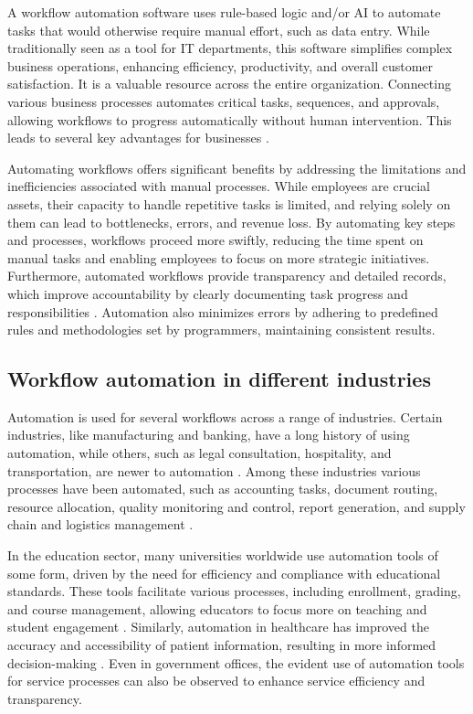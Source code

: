 A workflow automation software uses rule-based logic and/or AI to automate tasks that would otherwise require manual effort, such as data entry. While traditionally seen as a tool for IT departments, this software simplifies complex business operations, enhancing efficiency, productivity, and overall customer satisfaction. It is a valuable resource across the entire organization. Connecting various business processes automates critical tasks, sequences, and approvals, allowing workflows to progress automatically without human intervention. This leads to several key advantages for businesses \cite{servicenow}.

Automating workflows offers significant benefits by addressing the limitations and inefficiencies associated with manual processes. While employees are crucial assets, their capacity to handle repetitive tasks is limited, and relying solely on them can lead to bottlenecks, errors, and revenue loss. By automating key steps and processes, workflows proceed more swiftly, reducing the time spent on manual tasks and enabling employees to focus on more strategic initiatives. Furthermore, automated workflows provide transparency and detailed records, which improve accountability by clearly documenting task progress and responsibilities \cite{awati2024}. Automation also minimizes errors by adhering to predefined rules and methodologies set by programmers, maintaining consistent results.

\subsection{Workflow automation in different industries}

Automation is used for several workflows across a range of industries. Certain industries, like manufacturing and banking, have a long history of using automation, while others, such as legal consultation, hospitality, and transportation, are newer to automation \cite{caban2021}. Among these industries various processes have been automated, such as accounting tasks, document routing, resource allocation, quality monitoring and control, report generation, and supply chain and logistics management \cite{aguirre2017, mcquilken2014}.

In the education sector, many universities worldwide use automation tools of some form, driven by the need for efficiency and compliance with educational standards. These tools facilitate various processes, including enrollment, grading, and course management, allowing educators to focus more on teaching and student engagement \cite{choudhary2024}. Similarly, automation in healthcare has improved the accuracy and accessibility of patient information, resulting in more informed decision-making \cite{gupta2020}. Even in government offices, the evident use of automation tools for service processes can also be observed to enhance service efficiency and transparency.

